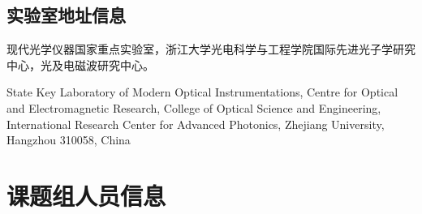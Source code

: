 \documentclass[cn,11pt,chinese]{elegantbook}
\begin{document}
\section{实验室地址信息}
现代光学仪器国家重点实验室，浙江大学光电科学与工程学院国际先进光子学研究中心，光及电磁波研究中心。

State Key Laboratory of Modern Optical Instrumentations, Centre for Optical and
Electromagnetic Research, College of Optical Science and Engineering, International
Research Center for Advanced Photonics, Zhejiang University, Hangzhou 310058, China


\chapter{课题组人员信息}
\end{document}
